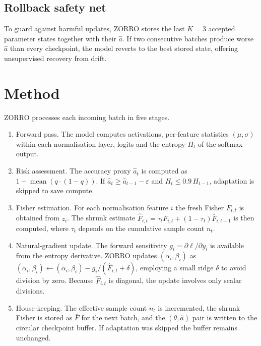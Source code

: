 \documentclass{article} %
\begin{document}
\subsection{Rollback safety net}
To guard against harmful updates, ZORRO stores the last \(K = 3\) accepted parameter states together with their \(\hat{a}\). If two consecutive batches produce worse \(\hat{a}\) than every checkpoint, the model reverts to the best stored state, offering unsupervised recovery from drift.

\section{Method}
\label{sec:method}
ZORRO processes each incoming batch in five stages.
\begin{enumerate}
\item Forward pass. The model computes activations, per-feature statistics \((\mu, \sigma)\) within each normalisation layer, logits and the entropy \(H_t\) of the softmax output.
\item Risk assessment. The accuracy proxy \(\hat{a}_t\) is computed as \(1 - \operatorname{mean}(q\cdot(1 - q))\). If \(\hat{a}_t \ge \hat{a}_{t-1} - \varepsilon\) and \(H_t \le 0.9\, H_{t-1}\), adaptation is skipped to save compute.
\item Fisher estimation. For each normalisation feature \(i\) the fresh Fisher \(F_{i,t}\) is obtained from \(z_i\). The shrunk estimate \(\hat{F}_{i,t} = \tau_t F_{i,t} + (1 - \tau_t)\bar{F}_{i,t-1}\) is then computed, where \(\tau_t\) depends on the cumulative sample count \(n_t\).
\item Natural-gradient update. The forward sensitivity \(g_i = \partial \ell/\partial y_i\) is available from the entropy derivative. ZORRO updates \((\alpha_i, \beta_i)\) as
\( (\alpha_i, \beta_i) \leftarrow (\alpha_i, \beta_i) - g_i / (\hat{F}_{i,t} + \delta) \), employing a small ridge \(\delta\) to avoid division by zero. Because \(\hat{F}_{i,t}\) is diagonal, the update involves only scalar divisions.
\item House-keeping. The effective sample count \(n_t\) is incremented, the shrunk Fisher is stored as \(\bar{F}\) for the next batch, and the \((\theta, \hat{a})\) pair is written to the circular checkpoint buffer. If adaptation was skipped the buffer remains unchanged.
\end{enumerate}
\end{document}
